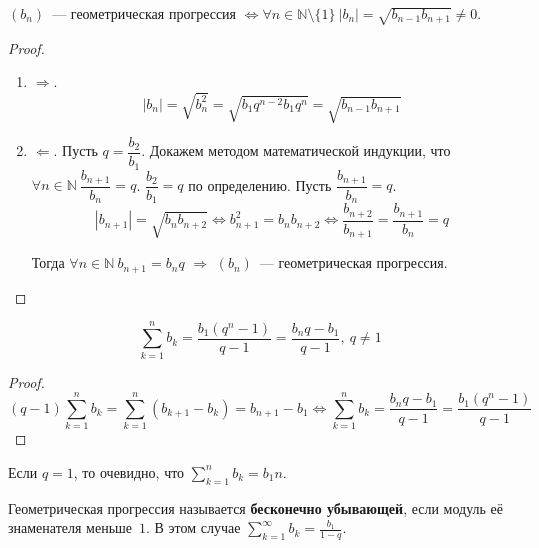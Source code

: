 \begin{theorem}
$(b_n)$~--- геометрическая прогрессия $\Leftrightarrow \forall n \in \mathbb N \setminus \{ 1 \} \ |b_n| = \sqrt{b_{n-1} b_{n+1}} \neq 0$.
\end{theorem}
\begin{proof}
\begin{enumerate}
	\item $\Rightarrow$.
	\begin{equation*}
	|b_n| = \sqrt{b_n^2} =
	\sqrt{b_1 q^{n-2} b_1 q^n} =
	\sqrt{b_{n-1} b_{n+1}}
	\end{equation*}
	
	\item $\Leftarrow$. Пусть $q = \dfrac{b_2}{b_1}$.
	Докажем методом математической индукции, что $\forall n \in \mathbb N \ \dfrac{b_{n+1}}{b_n} = q$.
		\indbase $\dfrac{b_2}{b_1} = q$ по определению.
		\indstep Пусть $\dfrac{b_{n+1}}{b_n} = q$.
		\begin{equation*}
		|b_{n+1}| = \sqrt{b_n b_{n+2}} \Leftrightarrow
		b_{n+1}^2 = b_n b_{n+2} \Leftrightarrow
		\frac{b_{n+2}}{b_{n+1}} = \frac{b_{n+1}}{b_n} = q
		\end{equation*}
		\indend
		
	Тогда $\forall n \in \mathbb N \ b_{n+1} = b_n q$ $\Rightarrow$ $(b_n)$~--- геометрическая прогрессия.
\end{enumerate}
\end{proof}

\begin{theorem}
\begin{equation*}
\sum_{k=1}^n b_k = \frac{b_1(q^n - 1)}{q - 1} = \frac{b_n q - b_1}{q - 1}, \ q \neq 1
\end{equation*}
\end{theorem}
\begin{proof}
\begin{equation*}
(q - 1) \sum_{k=1}^n b_k =
\sum_{k=1}^n (b_{k+1} - b_k) =
b_{n+1} - b_1 \Leftrightarrow
\sum_{k=1}^n b_k = \frac{b_n q - b_1}{q - 1} = \frac{b_1(q^n - 1)}{q - 1}
\end{equation*}
\end{proof}

Если $q = 1$, то очевидно, что $\sum\limits_{k=1}^n b_k = b_1 n$.

Геометрическая прогрессия называется \textbf{бесконечно убывающей}, если модуль её знаменателя меньше~$1$.
В этом случае $\sum\limits_{k=1}^\infty b_k = \frac{b_1}{1 - q}$.